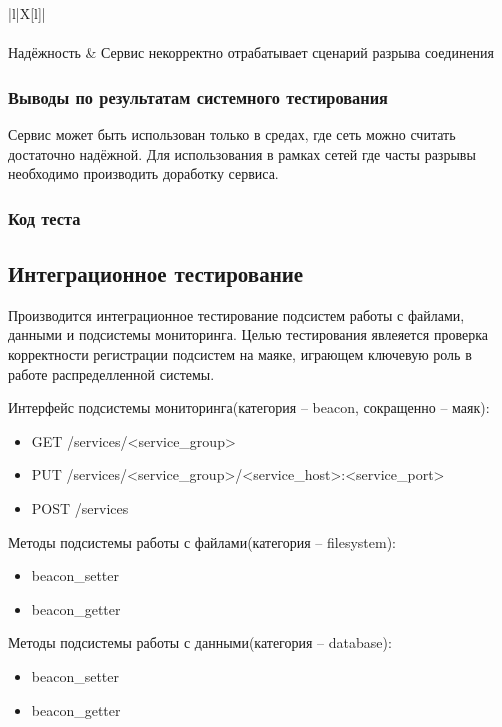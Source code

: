 \documentclass[a4paper,12pt]{report}
\numberwithin{equation}{section}
\begin{document}
\noindent
\begin{tabu}{|l|X[l]|}\hline
  \\\hline
  \\\hline
  Надёжность & Сервис некорректно отрабатывает сценарий разрыва соединения \\\hline
\end{tabu}

\subsubsection{Выводы по результатам системного тестирования}
Сервис может быть использован только в средах, где сеть можно считать достаточно надёжной. Для использования в рамках сетей где часты разрывы необходимо производить доработку сервиса.

\subsubsection{Код теста}


\clearpage
\subsection{Интеграционное тестирование}
Производится интеграционное тестирование подсистем работы с файлами, данными и подсистемы мониторинга. Целью тестирования явлеяется проверка
корректности регистрации подсистем на маяке, играющем ключевую роль в работе распределленной системы.

Интерфейс подсистемы мониторинга(категория -- beacon, сокращенно -- маяк):
\begin{itemize}
  \item GET /services/<service\_group>
  \item PUT /services/<service\_group>/<service\_host>:<service\_port>
  \item POST /services
\end{itemize}

Методы подсистемы работы с файлами(категория -- filesystem):
\begin{itemize}
  \item beacon\_setter
  \item beacon\_getter
\end{itemize}

Методы подсистемы работы с данными(категория -- database):
\begin{itemize}
  \item beacon\_setter
  \item beacon\_getter
\end{itemize}
\end{document}

